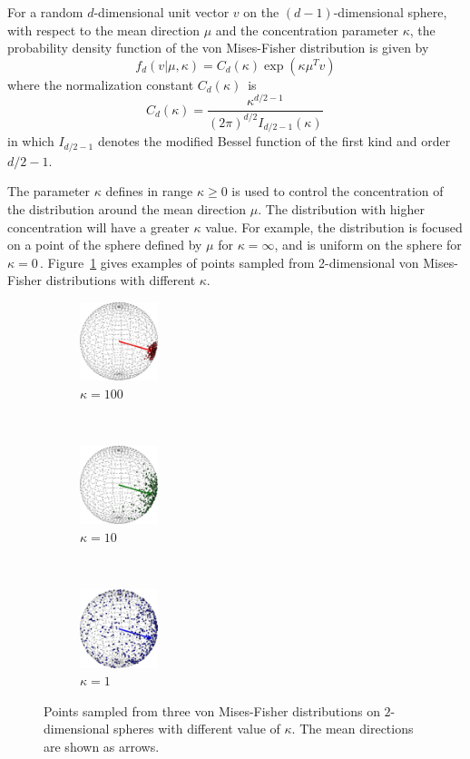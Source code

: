 For a random $d$-dimensional unit vector $v$ on the $(d-1)$-dimensional sphere, with respect to the mean direction $\mu$ and the concentration parameter $\kappa$, the probability density function of the von Mises-Fisher distribution is given by
\begin{equation}
  f_{d}(v| \mu, \kappa)=C_{d}(\kappa)\exp \left( {\kappa \mu^T v } \right)
\end{equation}
where the normalization constant $C_{d}(\kappa)\,$ is
\begin{equation}
  C_{d}(\kappa)=\frac {\kappa^{d/2-1}} {(2\pi)^{d/2}I_{d/2-1}(\kappa)} \,
\end{equation}
in which $I_{d/2-1}$ denotes the modified Bessel function of the first kind and order $d/2-1$.

The parameter $\kappa$ defines in range $\kappa \ge 0$ is used to control the concentration of the distribution around the mean direction $\mu$. The distribution with higher concentration will have a greater $\kappa$ value. For example, the distribution is focused on a point of the sphere defined by $\mu$ for $\kappa  = \infty$, and is uniform on the sphere for $\kappa=0\,$. Figure~\ref{fisher} gives examples of points sampled from 2-dimensional von Mises-Fisher distributions with different $\kappa$.

\begin{figure}[htb!f]
  \centering
  \begin{subfigure}[b]{0.16\textwidth}
    \centering
    \includegraphics[width=0.9in]{../figures/vf_100.eps}
    \caption{$\kappa=100$}
  \end{subfigure}~
  \begin{subfigure}[b]{0.16\textwidth}
    \centering
    \includegraphics[width=0.9in]{../figures/vf_10.eps}
    \caption{$\kappa=10$}
  \end{subfigure}~
  \begin{subfigure}[b]{0.16\textwidth}
    \centering
    \includegraphics[width=0.9in]{../figures/vf_1.eps}
    \caption{$\kappa=1$}
  \end{subfigure}
  \caption{Points sampled from three von Mises-Fisher distributions on $2$-dimensional spheres with different value of $\kappa$. The mean directions are shown as arrows.}
  \label{fisher}
\end{figure}

